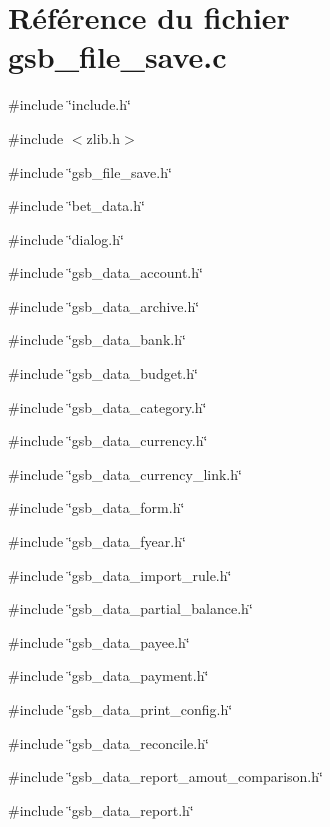 \section{Référence du fichier gsb\_\-file\_\-save.c}
\label{gsb__file__save_8c}
{\ttfamily \#include \char`\"{}include.h\char`\"{}}\par
{\ttfamily \#include $<$zlib.h$>$}\par
{\ttfamily \#include \char`\"{}gsb\_\-file\_\-save.h\char`\"{}}\par
{\ttfamily \#include \char`\"{}bet\_\-data.h\char`\"{}}\par
{\ttfamily \#include \char`\"{}dialog.h\char`\"{}}\par
{\ttfamily \#include \char`\"{}gsb\_\-data\_\-account.h\char`\"{}}\par
{\ttfamily \#include \char`\"{}gsb\_\-data\_\-archive.h\char`\"{}}\par
{\ttfamily \#include \char`\"{}gsb\_\-data\_\-bank.h\char`\"{}}\par
{\ttfamily \#include \char`\"{}gsb\_\-data\_\-budget.h\char`\"{}}\par
{\ttfamily \#include \char`\"{}gsb\_\-data\_\-category.h\char`\"{}}\par
{\ttfamily \#include \char`\"{}gsb\_\-data\_\-currency.h\char`\"{}}\par
{\ttfamily \#include \char`\"{}gsb\_\-data\_\-currency\_\-link.h\char`\"{}}\par
{\ttfamily \#include \char`\"{}gsb\_\-data\_\-form.h\char`\"{}}\par
{\ttfamily \#include \char`\"{}gsb\_\-data\_\-fyear.h\char`\"{}}\par
{\ttfamily \#include \char`\"{}gsb\_\-data\_\-import\_\-rule.h\char`\"{}}\par
{\ttfamily \#include \char`\"{}gsb\_\-data\_\-partial\_\-balance.h\char`\"{}}\par
{\ttfamily \#include \char`\"{}gsb\_\-data\_\-payee.h\char`\"{}}\par
{\ttfamily \#include \char`\"{}gsb\_\-data\_\-payment.h\char`\"{}}\par
{\ttfamily \#include \char`\"{}gsb\_\-data\_\-print\_\-config.h\char`\"{}}\par
{\ttfamily \#include \char`\"{}gsb\_\-data\_\-reconcile.h\char`\"{}}\par
{\ttfamily \#include \char`\"{}gsb\_\-data\_\-report\_\-amout\_\-comparison.h\char`\"{}}\par
{\ttfamily \#include \char`\"{}gsb\_\-data\_\-report.h\char`\"{}}\par
